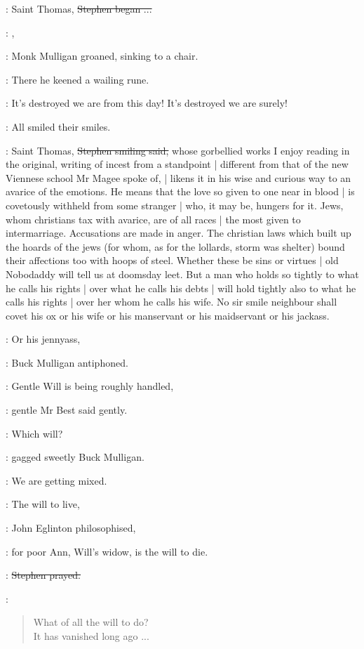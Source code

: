 \Stephen:
Saint Thomas,
\sout{Stephen began ...}

\mulligan:
,

:
Monk Mulligan groaned,
sinking to a chair.

:
There he keened a wailing rune.

\mulligan:
It's destroyed we are from this day!
It's destroyed we are surely!

:
All smiled their smiles.

\Stephen:
Saint Thomas,
\sout{Stephen smiling said,}
whose gorbellied works I enjoy reading in the original,
writing of incest from a standpoint |
different from that of the new Viennese school Mr Magee spoke of, |
likens it in his wise and curious way to an avarice of the emotions.
He means that the love so given to one near in blood |
is covetously withheld from some stranger |
who, it may be,
hungers for it.
Jews, whom christians tax with avarice,
are of all races |
the most given to intermarriage.
Accusations are made in anger.
The christian laws which built up the hoards of the jews
(for whom,
as for the lollards,
storm was shelter)
bound their affections too with hoops of steel.
Whether these be sins or virtues |
old Nobodaddy will tell us at doomsday leet.
But a man who holds so tightly to what he calls his rights |
over what he calls his debts |
will hold tightly also to what he calls his rights |
over her whom he calls his wife.
No sir smile neighbour
shall covet his ox
or his wife
or his manservant
or his maidservant
or his jackass.

\mulligan:
Or his jennyass,

:
Buck Mulligan antiphoned.

\best:
Gentle Will is being roughly handled,

:
gentle Mr Best said gently.

\mulligan:
Which will?

:
gagged sweetly Buck Mulligan.

\mulligan:
We are getting mixed.

\eglinton:
The will to live,

:
John Eglinton philosophised,

\eglinton:
for poor Ann,
Will's widow,
is the will to die.

\Stephen:
\sout{Stephen prayed.}

\Stephen:
\begin{verse}
    What of all the will to do? \\
    It has vanished long ago ...
\end{verse}

